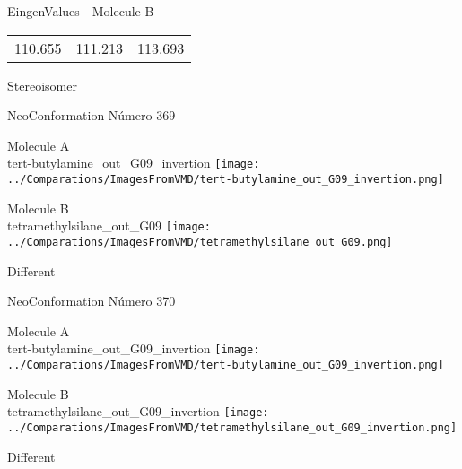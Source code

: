 \begin{multicols}{2}
\begin{center}
\vtab
 EingenValues - Molecule B     \\
\vtab
\begin{tabular}{|c c c|}
110.655	 & 	111.213	 & 	113.693	 \\
\end{tabular}

\end{center}
\end{multicols}
\begin{center}
\vtab
\vtab
\textcolor{NavyBlue}{\Large Stereoisomer}
\end{center}

 \newpage

\vtab[-2cm]
\begin{center}
{\large NeoConformation \tab Número 369}
\end{center}
\begin{multicols}{2}
\begin{center}
Molecule A \\ 
tert-butylamine\_out\_G09\_invertion
\texttt{[image: ../Comparations/ImagesFromVMD/tert-butylamine\_out\_G09\_invertion.png]}
\\
\vtab

\columnbreak
Molecule B \\ 
tetramethylsilane\_out\_G09
\texttt{[image: ../Comparations/ImagesFromVMD/tetramethylsilane\_out\_G09.png]}
\\
\vtab


\end{center}
\end{multicols}
\begin{center}
\vtab
\vtab
\textcolor{NavyBlue}{\Large Different}
\end{center}

 \newpage

\vtab[-2cm]
\begin{center}
{\large NeoConformation \tab Número 370}
\end{center}
\begin{multicols}{2}
\begin{center}
Molecule A \\ 
tert-butylamine\_out\_G09\_invertion
\texttt{[image: ../Comparations/ImagesFromVMD/tert-butylamine\_out\_G09\_invertion.png]}
\\
\vtab

\columnbreak
Molecule B \\ 
tetramethylsilane\_out\_G09\_invertion
\texttt{[image: ../Comparations/ImagesFromVMD/tetramethylsilane\_out\_G09\_invertion.png]}
\\
\vtab


\end{center}
\end{multicols}
\begin{center}
\vtab
\vtab
\textcolor{NavyBlue}{\Large Different}
\end{center}

